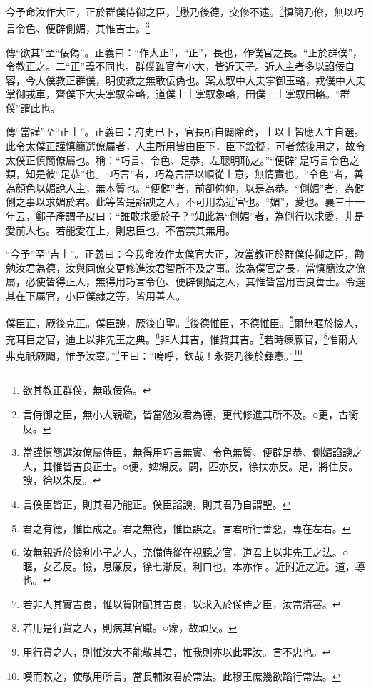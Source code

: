 今予命汝作大正，正於群僕侍御之臣，\footnote{欲其教正群僕，無敢佞偽。}懋乃後德，交修不逮。\footnote{言侍御之臣，無小大親疏，皆當勉汝君為德，更代修進其所不及。○更，古衡反。}慎簡乃僚，無以巧言令色、便辟側媚，其惟吉士。\footnote{當謹慎簡選汝僚屬侍臣，無得用巧言無實、令色無質、便辟足恭、側媚諂諛之人，其惟皆吉良正士。○便，婢綿反。闢，匹亦反，徐扶亦反。足，將住反。諛，徐以朱反。}


{\noindent\zhuan{}\fzbyks 傳“欲其”至“佞偽”。正義曰：“作大正”，“正”，長也，作僕官之長。“正於群僕”，令教正之。二“正”義不同也。群僕雖官有小大，皆近天子。近人主者多以諂佞自容，今大僕教正群僕，明使教之無敢佞偽也。案太馭中大夫掌御玉輅，戎僕中大夫掌御戎車，齊僕下大夫掌馭金輅，道僕上士掌馭象輅，田僕上士掌馭田輅。“群僕”謂此也。 \par}

{\noindent\zhuan{}\fzbyks 傳“當謹”至“正士”。正義曰：府史已下，官長所自闢除命，士以上皆應人主自選。此令太僕正謹慎簡選僚屬者，人主所用皆由臣下，臣下銓擬，可者然後用之，故令太僕正慎簡僚屬也。稱：“巧言、令色、足恭，左聰明恥之。”“便辟”是巧言令色之類，知是彼“足恭”也。“巧言”者，巧為言語以順從上意，無情實也。“令色”者，善為顏色以媚說人主，無本質也。“便僻”者，前卻俯仰，以是為恭。“側媚”者，為僻側之事以求媚於君。此等皆是諂諛之人，不可用為近官也。“媚”，愛也。襄三十一年云，鄭子產謂子皮曰：“誰敢求愛於子？”知此為“側媚”者，為側行以求愛，非是愛前人也。若能愛在上，則忠臣也，不當禁其無用。 \par}

{\noindent\shu{}\fzkt “今予”至“吉士”。正義曰：今我命汝作太僕官大正，汝當教正於群僕侍御之臣，勸勉汝君為德，汝與同僚交更修進汝君智所不及之事。汝為僕官之長，當慎簡汝之僚屬，必使皆得正人，無得用巧言令色、便辟側媚之人，其惟皆當用吉良善士。令選其在下屬官，小臣僕隸之等，皆用善人。 \par}

僕臣正，厥後克正。僕臣諛，厥後自聖。\footnote{言僕臣皆正，則其君乃能正。僕臣諂諛，則其君乃自謂聖。}後德惟臣，不德惟臣。\footnote{君之有德，惟臣成之。君之無德，惟臣誤之。言君所行善惡，專在左右。}爾無暱於憸人，充耳目之官，迪上以非先王之典。\footnote{汝無親近於憸利小子之人，充備侍從在視聽之官，道君上以非先王之法。○暱，女乙反。憸，息廉反，徐七漸反，利口也，本亦作𢘼。近附近之近。道，導也。}非人其吉，惟貨其吉。\footnote{若非人其實吉良，惟以貨財配其吉良，以求入於僕侍之臣，汝當清審。}若時瘝厥官，\footnote{若用是行貨之人，則病其官職。○瘝，故頑反。}惟爾大弗克祇厥闢，惟予汝辜。”\footnote{用行貨之人，則惟汝大不能敬其君，惟我則亦以此罪汝。言不忠也。}王曰：“嗚呼，欽哉！永弼乃後於彝憲。”\footnote{嘆而敕之，使敬用所言，當長輔汝君於常法。此穆王庶幾欲蹈行常法。}

